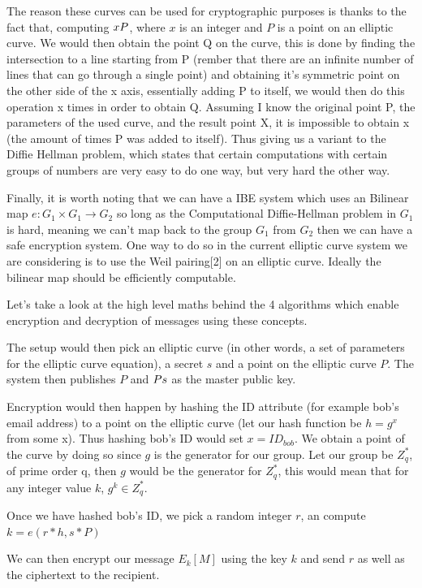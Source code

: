 \documentclass[conference]{IEEEtran}
\begin{document}
The reason these
curves can be used for cryptographic purposes is thanks to the fact that, computing 
$x\*P$, where $x$ is an integer and $P$ is a point on an elliptic curve. 
We would then obtain the point Q on the curve, this is done by finding the intersection to a 
line starting from P (rember that there are an infinite number of lines that can go through a single point)
and obtaining it's symmetric point on the other side of the x axis, essentially adding P to itself, we would then do this 
operation x times in order to obtain Q.
Assuming I know the original point P, the parameters of the used curve, and the result point X, it is impossible
to obtain x (the amount of times P was added to itself).
Thus giving us a variant to the Diffie Hellman problem, which states that certain computations with 
certain groups of numbers are very easy to do one way, but very hard the other way.


Finally, it is worth noting that we can have a IBE system which uses an Bilinear map 
$e: G_{1}\times G_{1} \rightarrow G_{2}$ so long as the Computational Diffie-Hellman problem 
in $G_{1}$ is hard, meaning we can't map back to the group $G_{1}$ from $G_{2}$ then we can have a 
safe encryption system. 
One way to do so in the current elliptic curve system we are considering is to use 
the Weil pairing[2] on an elliptic curve. Ideally the bilinear map should be efficiently computable.


Let's take a look at the high level maths behind the 4 algorithms which enable 
encryption and decryption of messages using these concepts.

The setup would then pick an elliptic curve 
(in other words, a set of parameters for the elliptic curve equation), 
a secret $s$ and a point on the 
elliptic curve $P$. The system then publishes $P$ and $P\*s$ as the master public key.


Encryption would then happen by hashing the ID attribute (for example bob's email address)
to a point on the elliptic curve (let our hash function be $h = g^x$ from some x). Thus
hashing bob's ID would set $ x = ID_{bob}$. We obtain a point of the curve by doing so since $g$
is the generator for our group. Let our group be $Z_{q}^*$, of prime order q, then $g$
would be the generator for $Z_{q}^*$, this would mean that for any integer value $k$,
$g^k \in Z_{q}^*$.

Once we have hashed bob's ID, we pick a random integer $r$, an compute 
$k = e(r*h, s*P)$

We can then encrypt our message $E_{k}[M]$ using the key $k$ and send $r$ as well as the ciphertext
to the recipient.
\end{document}
